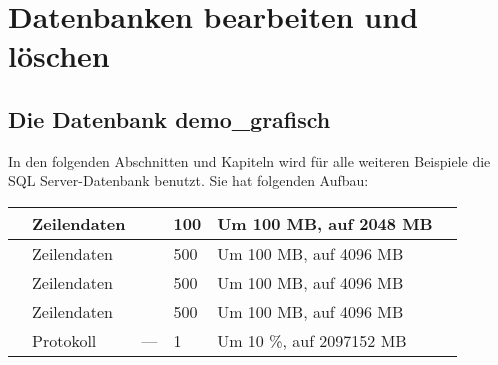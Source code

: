     \section{Datenbanken bearbeiten und löschen}
      \subsection{Die Datenbank demo\_grafisch}
        In den folgenden Abschnitten und Kapiteln wird f\"ur alle weiteren
        Beispiele die SQL Server-Datenbank  benutzt.
        Sie hat folgenden Aufbau:
        \begin{center}
          \begin{scriptsize}
            \tablehead{}
            \tabletail {
            }
            \tablelasttail {
            }
            \begin{supertabular}{llll>{\centering}p{2.5cm}p{3.75cm}}
               & Zeilendaten &  & 100 & Um 100 MB,
              auf 2048 MB &  
              \\
              \hline
               & Zeilendaten &  & 500 & Um 100 MB, auf 4096
              MB &   \\
              \hline
               & Zeilendaten &  & 500 &
              Um 100 MB, auf 4096 MB &   \\
              \hline
               & Zeilendaten &  & 500 &
              Um 100 MB, auf 4096 MB &   \\
              \hline
               & Protokoll & --- & 1 & Um 10 \%, auf
              2097152 MB &   \\
            \end{supertabular}
          \end{scriptsize}
        \end{center}
